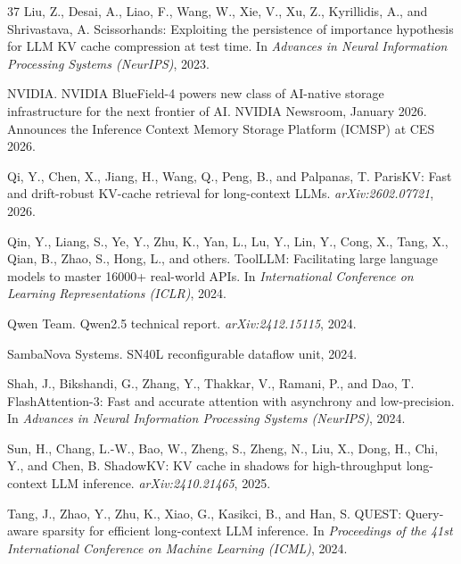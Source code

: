 \documentclass{article}
\begin{document}
\begin{thebibliography}{37}
Liu, Z., Desai, A., Liao, F., Wang, W., Xie, V., Xu, Z.,
  Kyrillidis, A., and Shrivastava, A.
\newblock Scissorhands: Exploiting the persistence of importance
  hypothesis for LLM KV cache compression at test time.
\newblock In \emph{Advances in Neural Information Processing Systems
  (NeurIPS)}, 2023.

NVIDIA.
\newblock NVIDIA BlueField-4 powers new class of AI-native storage infrastructure for the next frontier of AI.
\newblock NVIDIA Newsroom, January 2026.
  Announces the Inference Context Memory Storage Platform (ICMSP) at CES 2026.

Qi, Y., Chen, X., Jiang, H., Wang, Q., Peng, B., and Palpanas, T.
\newblock ParisKV: Fast and drift-robust KV-cache retrieval for
  long-context LLMs.
\newblock \emph{arXiv:2602.07721}, 2026.

Qin, Y., Liang, S., Ye, Y., Zhu, K., Yan, L., Lu, Y., Lin, Y.,
  Cong, X., Tang, X., Qian, B., Zhao, S., Hong, L., and others.
\newblock ToolLLM: Facilitating large language models to master
  16000+ real-world APIs.
\newblock In \emph{International Conference on Learning
  Representations (ICLR)}, 2024.

Qwen Team.
\newblock Qwen2.5 technical report.
\newblock \emph{arXiv:2412.15115}, 2024.

SambaNova Systems.
\newblock SN40L reconfigurable dataflow unit, 2024.

Shah, J., Bikshandi, G., Zhang, Y., Thakkar, V., Ramani, P., and Dao, T.
\newblock FlashAttention-3: Fast and accurate attention with asynchrony
  and low-precision.
\newblock In \emph{Advances in Neural Information Processing Systems
  (NeurIPS)}, 2024.

Sun, H., Chang, L.-W., Bao, W., Zheng, S., Zheng, N., Liu, X., Dong,
  H., Chi, Y., and Chen, B.
\newblock ShadowKV: KV cache in shadows for high-throughput long-context
  LLM inference.
\newblock \emph{arXiv:2410.21465}, 2025.

Tang, J., Zhao, Y., Zhu, K., Xiao, G., Kasikci, B., and Han, S.
\newblock QUEST: Query-aware sparsity for efficient long-context LLM
  inference.
\newblock In \emph{Proceedings of the 41st International Conference on
  Machine Learning (ICML)}, 2024.


\end{thebibliography}
\end{document}
